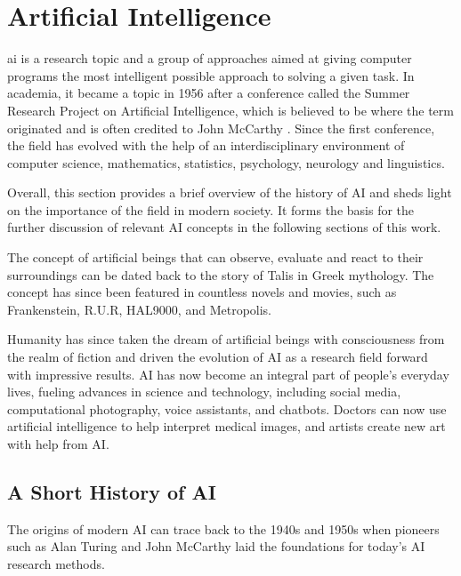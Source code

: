 \label{sec:2_background_theory}


\section{Artificial Intelligence}

\gls{ai} is a research topic and a group of approaches aimed at giving computer programs the most intelligent possible approach to solving a given task. In academia, it became a topic in 1956 after a conference called the Summer Research Project on Artificial Intelligence, which is believed to be where the term originated and is often credited to John McCarthy \cite{mccarthyProposalDartmouthSummer2006, andresenJohnMcCarthyFather2002}. Since the first conference, the field has evolved with the help of an interdisciplinary environment of computer science, mathematics, statistics, psychology, neurology and linguistics.

Overall, this section provides a brief overview of the history of AI and sheds light on the importance of the field in modern society. It forms the basis for the further discussion of relevant AI concepts in the following sections of this work.

The concept of artificial beings that can observe, evaluate and react to their surroundings can be dated back to the story of Talis in Greek mythology. The concept has since been featured in countless novels and movies, such as Frankenstein, R.U.R, HAL9000, and Metropolis. 

Humanity has since taken the dream of artificial beings with consciousness from the realm of fiction and driven the evolution of AI as a research field forward with impressive results. 
AI has now become an integral part of people's everyday lives, fueling advances in science and technology, including social media, computational photography, voice assistants, and chatbots. Doctors can now use artificial intelligence to help interpret medical images, and artists create new art with help from AI.


\subsection{A Short History of AI}
The origins of modern AI can trace back to the 1940s and 1950s when pioneers such as Alan Turing and John McCarthy laid the foundations for today's AI research methods. 

